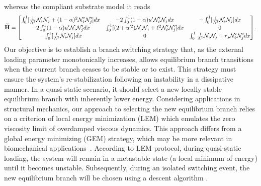 whereas the compliant substrate model it reads
\begin{equation}
    \widetilde{\mathbf{H}}=
    \begin{bmatrix}
    \int_0^1[ \frac{1}{\Lambda^2}{\mathcal N}_i{\mathcal N}_j + (1-\alpha)^2{\mathcal N}'_i{\mathcal N}'_j] dx&
-2\int_0^1(1-\alpha)u' {\mathcal N}'_i {\mathcal N}_j  dx&
-\int_0^1[\frac{1}{\Lambda^2}{\mathcal N}_i {\mathcal N}_j]  dx\\

-2\int_0^1(1-\alpha)u' {\mathcal N}_i {\mathcal N}'_j dx&
 \int_0^1 [ (2+u'^2){\mathcal N}_i{\mathcal N}_j +\ell^2{\mathcal N}'_i{\mathcal N}'_j] dx&
 0\\

-\int_0^1[\frac{1}{\Lambda^2}{\mathcal N}_i{\mathcal N}_j ] dx
&0
&\int_0^1\frac{1}{\Lambda^2}{\mathcal N}_i {\mathcal N}_j+r_s{\mathcal N}'_i {\mathcal N}'_j  dx
\end{bmatrix}.
\label{eq:stifness2}
\end{equation}
Our objective is to establish a branch switching strategy that,
as the external loading parameter monotonically increases, allows equilibrium branch transitions when the current branch ceases to be stable or to exist.
This strategy must ensure the system's re-stabilization following an instability in a dissipative manner. In a quasi-static scenario, it should select a new locally stable equilibrium branch with inherently lower energy.  Considering applications in structural mechanics, our approach to selecting the new equilibrium branch relies on a criterion of local energy minimization (LEM) which emulates the zero viscosity limit of overdamped viscous dynamics. This approach differs from a global energy minimizing (GEM) strategy, which may be more relevant in biomechanical applications~\cite{Salman2021-mn}. According to LEM protocol, during quasi-static loading, the system will remain in a metastable state (a local minimum of energy) until it becomes unstable. Subsequently, during an isolated switching event, the new equilibrium branch will be chosen using a descent algorithm \cite{Puglisi2005-lg}.
